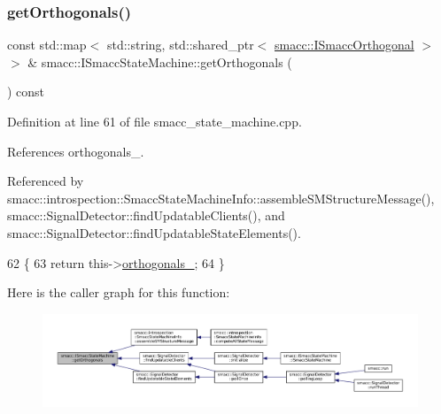 \subsubsection{\texorpdfstring{get\+Orthogonals()}{getOrthogonals()}}
{\footnotesize\ttfamily const std\+::map$<$ std\+::string, std\+::shared\+\_\+ptr$<$ \hyperlink{classsmacc_1_1ISmaccOrthogonal}{smacc\+::\+I\+Smacc\+Orthogonal} $>$ $>$ \& smacc\+::\+I\+Smacc\+State\+Machine\+::get\+Orthogonals (\begin{DoxyParamCaption}{ }\end{DoxyParamCaption}) const}



Definition at line 61 of file smacc\+\_\+state\+\_\+machine.\+cpp.



References orthogonals\+\_\+.



Referenced by smacc\+::introspection\+::\+Smacc\+State\+Machine\+Info\+::assemble\+S\+M\+Structure\+Message(), smacc\+::\+Signal\+Detector\+::find\+Updatable\+Clients(), and smacc\+::\+Signal\+Detector\+::find\+Updatable\+State\+Elements().


\begin{DoxyCode}
62 \{
63     \textcolor{keywordflow}{return} this->\hyperlink{classsmacc_1_1ISmaccStateMachine_acc5944f313bc6ce1637c632243a511f2}{orthogonals\_};
64 \}
\end{DoxyCode}
Here is the caller graph for this function\+:
\nopagebreak
\begin{figure}[H]
\begin{center}
\leavevmode
\includegraphics[width=350pt]{classsmacc_1_1ISmaccStateMachine_a7f5b2882dbd077584767cb2533ed3c49_icgraph}
\end{center}
\end{figure}
\mbox{\label{classsmacc_1_1ISmaccStateMachine_ac9fda4abe36f62db5ae231289afa4665}} 
